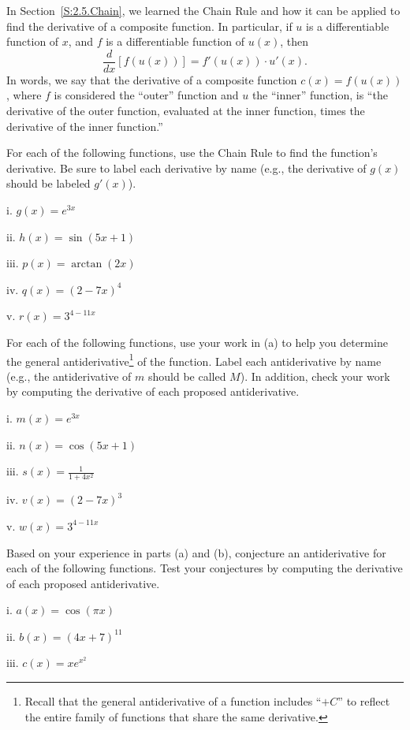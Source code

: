 \begin{pa} \label{PA:5.3}
In Section~\ref{S:2.5.Chain}, we learned the Chain Rule and how it can be applied to find the derivative of a composite function.  In particular, if $u$ is a differentiable function of $x$, and $f$ is a differentiable function of $u(x)$, then
$$\frac{d}{dx} \left[ f(u(x))  \right] = f'(u(x)) \cdot u'(x).$$
In words, we say that the derivative of a composite function $c(x) = f(u(x))$, where $f$ is considered the ``outer'' function and $u$ the ``inner'' function, is ``the derivative of the outer function, evaluated at the inner function, times the derivative of the inner function.''  
\ba
	\item For each of the following functions, use the Chain Rule to find the function's derivative.  Be sure to label each derivative by name (e.g., the derivative of $g(x)$ should be labeled $g'(x)$).
	\be
		\item[i.] $g(x) = e^{3x}$
		\item[ii.] $h(x) = \sin(5x+1)$
		\item[iii.] $p(x) = \arctan(2x)$
		\item[iv.] $q(x) = (2-7x)^4$
		\item[v.] $r(x) = 3^{4-11x}$
	\ee
	\item For each of the following functions, use your work in (a) to help you determine the general antiderivative\footnote{Recall that the general antiderivative of a function includes ``$+C$'' to reflect the entire family of functions that share the same derivative.} of the function.  Label each antiderivative by name (e.g., the antiderivative of $m$ should be called $M$).  In addition, check your work by computing the derivative of each proposed antiderivative.
	\be
		\item[i.] $m(x) = e^{3x}$
		\item[ii.] $n(x) = \cos(5x+1)$
		\item[iii.] $s(x) = \frac{1}{1+4x^2}$
		\item[iv.] $v(x) = (2-7x)^3$
		\item[v.] $w(x) = 3^{4-11x}$
	\ee
	\item Based on your experience in parts (a) and (b), conjecture an antiderivative for each of the following functions.  Test your conjectures by computing the derivative of each proposed antiderivative.
	\be
		\item[i.] $a(x) = \cos(\pi x)$
		\item[ii.] $b(x) = (4x+7)^{11}$
		\item[iii.] $c(x) = xe^{x^2}$
	\ee
\ea
\end{pa} 
\afterpa